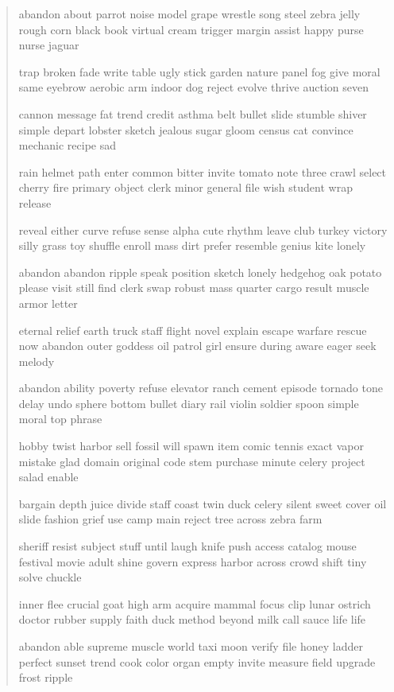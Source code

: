 \documentclass[a5paper, twoside]{book}
\begin{document}
\begin{verse}
 abandon about parrot noise model grape wrestle song steel zebra jelly rough corn black book virtual cream trigger margin assist happy purse nurse jaguar

 trap broken fade write table ugly stick garden nature panel fog give moral same eyebrow aerobic arm indoor dog reject evolve thrive auction seven

 cannon message fat trend credit asthma belt bullet slide stumble shiver simple depart lobster sketch jealous sugar gloom census cat convince mechanic recipe sad

 rain helmet path enter common bitter invite tomato note three crawl select cherry fire primary object clerk minor general file wish student wrap release

 reveal either curve refuse sense alpha cute rhythm leave club turkey victory silly grass toy shuffle enroll mass dirt prefer resemble genius kite lonely

 abandon abandon ripple speak position sketch lonely hedgehog oak potato please visit still find clerk swap robust mass quarter cargo result muscle armor letter

 eternal relief earth truck staff flight novel explain escape warfare rescue now abandon outer goddess oil patrol girl ensure during aware eager seek melody

 abandon ability poverty refuse elevator ranch cement episode tornado tone delay undo sphere bottom bullet diary rail violin soldier spoon simple moral top phrase

 hobby twist harbor sell fossil will spawn item comic tennis exact vapor mistake glad domain original code stem purchase minute celery project salad enable

 bargain depth juice divide staff coast twin duck celery silent sweet cover oil slide fashion grief use camp main reject tree across zebra farm

 sheriff resist subject stuff until laugh knife push access catalog mouse festival movie adult shine govern express harbor across crowd shift tiny solve chuckle

 inner flee crucial goat high arm acquire mammal focus clip lunar ostrich doctor rubber supply faith duck method beyond milk call sauce life life

 abandon able supreme muscle world taxi moon verify file honey ladder perfect sunset trend cook color organ empty invite measure field upgrade frost ripple


\end{verse}
\end{document}
